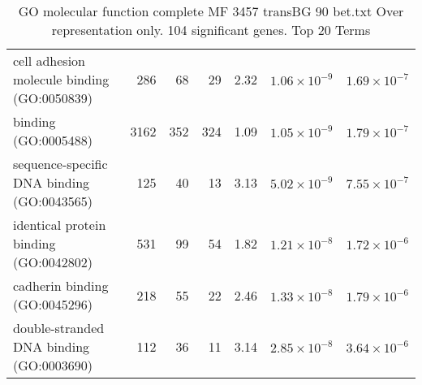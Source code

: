 \begin{table}[ht]
\begin{adjustbox}{width=\textwidth}
\begin{tabular}{lrrrlrr}
  cell adhesion molecule binding (GO:0050839) & 286 & 68 & 29 & 2.32 & $1.06 \times 10^{-9}$ & $1.69 \times 10^{-7}$ \\ 
  binding (GO:0005488) & 3162 & 352 & 324 & 1.09 & $1.05 \times 10^{-9}$ & $1.79 \times 10^{-7}$ \\ 
  sequence-specific DNA binding (GO:0043565) & 125 & 40 & 13 & 3.13 & $5.02 \times 10^{-9}$ & $7.55 \times 10^{-7}$ \\ 
  identical protein binding (GO:0042802) & 531 & 99 & 54 & 1.82 & $1.21 \times 10^{-8}$ & $1.72 \times 10^{-6}$ \\ 
  cadherin binding (GO:0045296) & 218 & 55 & 22 & 2.46 & $1.33 \times 10^{-8}$ & $1.79 \times 10^{-6}$ \\ 
  double-stranded DNA binding (GO:0003690) & 112 & 36 & 11 & 3.14 & $2.85 \times 10^{-8}$ & $3.64 \times 10^{-6}$ \\ 
   \hline
\end{tabular}
\end{adjustbox}
\caption{GO molecular function complete MF 3457 transBG 90 bet.txt Over representation only. 104 significant genes. Top 20 Terms} 
\label{tab:GO molecular function complete MF 3457 transBG 90 bet.txt Over representation only. 104 significant genes. Top 20 Terms}
\end{table}




